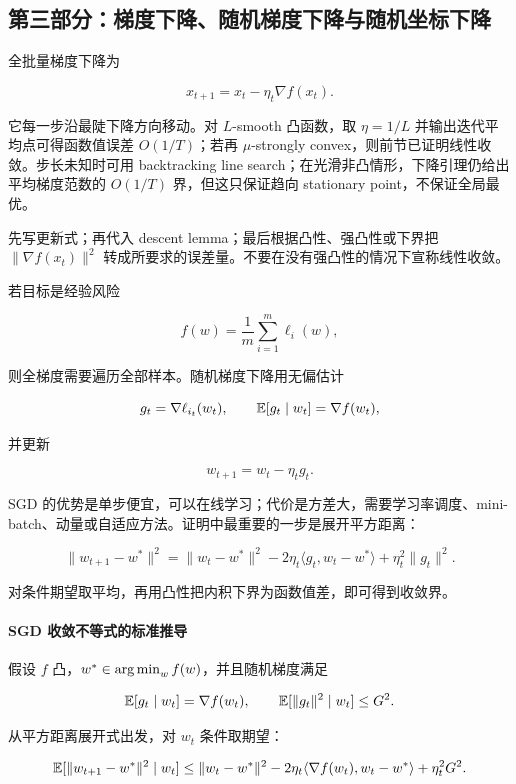 \documentclass[11pt]{ctexart}
\begin{document}
\subsection{第三部分：梯度下降、随机梯度下降与随机坐标下降}


全批量梯度下降为

\[
  x_{t+1}=x_t-\eta_t\nabla f(x_t).
\]

它每一步沿最陡下降方向移动。对 \(L\)-smooth 凸函数，取 \(\eta=1/L\) 并输出迭代平均点可得函数值误差 \(O(1/T)\)；若再 \(\mu\)-strongly convex，则前节已证明线性收敛。步长未知时可用 backtracking line search；在光滑非凸情形，下降引理仍给出平均梯度范数的 \(O(1/T)\) 界，但这只保证趋向 stationary point，不保证全局最优。
\begin{examnote}[GD 的解题模板]
先写更新式；再代入 descent lemma；最后根据凸性、强凸性或下界把 \(\|\nabla f(x_t)\|^2\) 转成所要求的误差量。不要在没有强凸性的情况下宣称线性收敛。
\end{examnote}

若目标是经验风险

\[
  f(w)=\frac1m\sum_{i=1}^{m}\ell_i(w),
\]

则全梯度需要遍历全部样本。随机梯度下降用无偏估计

\[
  g_t=\nabla \ell_{i_t}(w_t),
  \qquad
  \mathbb{E}[g_t\mid w_t]=\nabla f(w_t),
\]

并更新

\[
  w_{t+1}=w_t-\eta_t g_t.
\]

SGD 的优势是单步便宜，可以在线学习；代价是方差大，需要学习率调度、mini-batch、动量或自适应方法。证明中最重要的一步是展开平方距离：

\[
  \|w_{t+1}-w^*\|^2
  =
  \|w_t-w^*\|^2
  -
  2\eta_t\langle g_t,w_t-w^*\rangle
  +
  \eta_t^2\|g_t\|^2.
\]

对条件期望取平均，再用凸性把内积下界为函数值差，即可得到收敛界。

\paragraph{SGD 收敛不等式的标准推导}

假设 \(f\) 凸，\(w^*\in\operatorname*{arg\,min}_w f(w)\)，并且随机梯度满足

\[
  \mathbb{E}[g_t\mid w_t]=\nabla f(w_t),
  \qquad
  \mathbb{E}[\|g_t\|^2\mid w_t]\le G^2.
\]

从平方距离展开式出发，对 \(w_t\) 条件取期望：

\[
  \mathbb{E}[\|w_{t+1}-w^*\|^2\mid w_t]
  \le
  \|w_t-w^*\|^2
  -
  2\eta_t\langle\nabla f(w_t),w_t-w^*\rangle
  +
  \eta_t^2G^2.
\]
\end{document}
